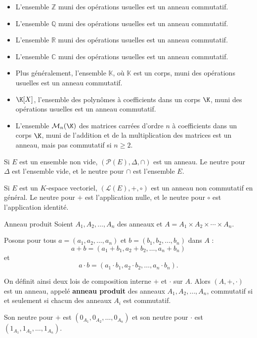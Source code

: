 \begin{exemple}
    \begin{itemize}
        \item L'ensemble $\mathbb{Z}$ muni des opérations usuelles est un anneau commutatif.
        \item L'ensemble $\mathbb{Q}$ muni des opérations usuelles est un anneau commutatif.
        \item L'ensemble $\mathbb{R}$ muni des opérations usuelles est un anneau commutatif.
        \item L'ensemble $\mathbb{C}$ muni des opérations usuelles est un anneau commutatif.
        \item Plus généralement, l'ensemble $\mathbb{K}$, où $\mathbb{K}$ est un corps, muni des opérations usuelles est un anneau commutatif.
        \item $\K[X]$, l'ensemble des polynômes à coefficients dans un corps $\K$, muni des opérations usuelles est un anneau commutatif.
        \item L'ensemble $\mathcal{M}_n(\K)$ des matrices carrées d'ordre $n$ à coefficients dans un corps $\K$, muni de l'addition et de la multiplication des matrices est un anneau, mais pas commutatif si $n \geq 2$.
    \end{itemize}

    Si $E$ est un ensemble non vide, $(\mathscr{P}(E), \Delta, \cap)$ est un anneau. Le neutre pour $\Delta$ est l'ensemble vide, 
    et le neutre pour $\cap$ est l'ensemble $E$.

    Si $E$ est un $K$-espace vectoriel, $(\mathscr{L}(E), +, \circ)$ est un anneau non commutatif en général. Le neutre pour $+$ est l'application nulle, et le neutre pour $\circ$ est l'application identité.
\end{exemple}


\begin{proposition}{Anneau produit}{}
    Soient $A_1, A_2, \ldots, A_n$ des anneaux et $A = A_1 \times A_2 \times \cdots \times A_n$.

    Posons pour tous $a = (a_1, a_2, \ldots, a_n)$ et $b = (b_1, b_2, \ldots, b_n)$ dans $A$ :
    \[
        a + b = (a_1 + b_1, a_2 + b_2, \ldots, a_n + b_n)
    \]
    et
    \[
        a \cdot b = (a_1 \cdot b_1, a_2 \cdot b_2, \ldots, a_n \cdot b_n).
    \]

    On définit ainsi deux lois de composition interne $+$ et $\cdot$ sur $A$.
    Alors $(A, +, \cdot)$ est un anneau, appelé \textbf{anneau produit} des anneaux $A_1, A_2, \ldots, A_n$, 
    commutatif si et seulement si chacun des anneaux $A_i$ est commutatif.

    Son neutre pour $+$ est $(0_{A_1}, 0_{A_2}, \ldots, 0_{A_n})$ et son neutre pour $\cdot$ est $(1_{A_1}, 1_{A_2}, \ldots, 1_{A_n})$.
\end{proposition}

